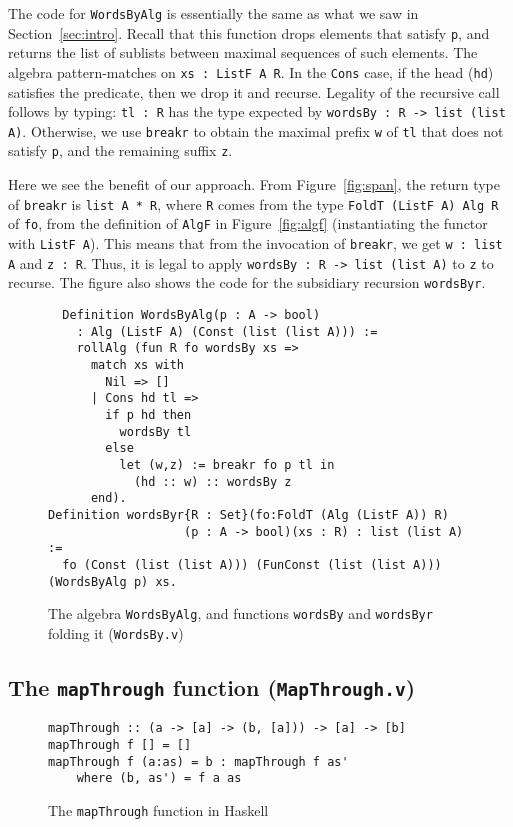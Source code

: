 \documentclass[a4paper,USenglish]{lipics-v2021}
\begin{document}
The code for \verb|WordsByAlg| is essentially
the same as what we saw in Section~\ref{sec:intro}.  Recall that this function drops elements
that satisfy \verb|p|, and returns the list of
sublists between maximal sequences of such elements.  The algebra
pattern-matches on \verb|xs : ListF A R|. In the
\verb|Cons| case, if the head (\verb|hd|) satisfies the predicate, then we
drop it and recurse.  Legality of the recursive call follows by typing: \verb|tl : R|
has the type expected by \verb|wordsBy : R -> list (list A)|.  Otherwise,
we use \verb|breakr| to obtain the maximal prefix \verb|w| of \verb|tl| that
does not satisfy \verb|p|, and the remaining suffix \verb|z|.

Here we see the benefit of our approach.  From Figure~\ref{fig:span},
the return type of \verb|breakr| is \verb|list A * R|, where \verb|R|
comes from the type \verb|FoldT (ListF A) Alg R| of
\verb|fo|, from the definition
of \verb|AlgF| in Figure~\ref{fig:algf} (instantiating the functor
with \verb|ListF A|).  This means that from the invocation of
\verb|breakr|, we get \verb|w : list A| and \verb|z : R|.  Thus, it is
legal to apply \verb|wordsBy : R -> list (list A)| to
\verb|z| to recurse.  The figure also shows the code for the subsidiary
recursion \verb|wordsByr|.

\begin{figure}
\begin{verbatim}
  Definition WordsByAlg(p : A -> bool)
    : Alg (ListF A) (Const (list (list A))) :=
    rollAlg (fun R fo wordsBy xs => 
      match xs with
        Nil => [] 
      | Cons hd tl =>
        if p hd then
          wordsBy tl
        else
          let (w,z) := breakr fo p tl in
            (hd :: w) :: wordsBy z
      end).
Definition wordsByr{R : Set}(fo:FoldT (Alg (ListF A)) R)
                   (p : A -> bool)(xs : R) : list (list A) :=
  fo (Const (list (list A))) (FunConst (list (list A))) (WordsByAlg p) xs.
\end{verbatim}
\caption{The algebra \texttt{WordsByAlg}, and functions \texttt{wordsBy} and \texttt{wordsByr} folding it (\texttt{WordsBy.v})}
\label{fig:wordsby}
\end{figure}

\subsection{The \texttt{mapThrough} function (\texttt{MapThrough.v})}

\begin{figure}
\begin{verbatim}
mapThrough :: (a -> [a] -> (b, [a])) -> [a] -> [b]
mapThrough f [] = []
mapThrough f (a:as) = b : mapThrough f as'
    where (b, as') = f a as
\end{verbatim}
\caption{The \texttt{mapThrough} function in Haskell}
\label{fig:mapthroughhs}
\end{figure}
\end{document}
